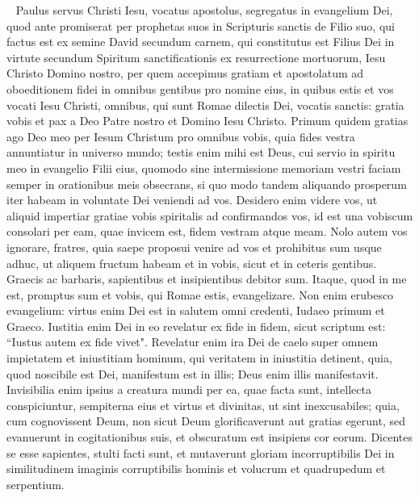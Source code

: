 
\begin{biblechapter}   
\verse Paulus servus Christi Iesu, vocatus apostolus, segregatus in evangelium Dei, 
\verse quod ante promiserat per prophetas suos in Scripturis sanctis 
\verse de Filio suo, qui factus est ex semine David secundum carnem, 
\verse qui constitutus est Filius Dei in virtute secundum Spiritum sanctificationis ex resurrectione mortuorum, Iesu Christo Domino nostro, 
\verse per quem accepimus gratiam et apostolatum ad oboeditionem fidei in omnibus gentibus pro nomine eius, 
\verse in quibus estis et vos vocati Iesu Christi,  
\verse omnibus, qui sunt Romae dilectis Dei, vocatis sanctis: gratia vobis et pax a Deo Patre nostro et Domino Iesu Christo. 
\verse Primum quidem gratias ago Deo meo per Iesum Christum pro omnibus vobis, quia fides vestra annuntiatur in universo mundo; 
\verse testis enim mihi est Deus, cui servio in spiritu meo in evangelio Filii eius, quomodo sine intermissione memoriam vestri faciam 
\verse semper in orationibus meis obsecrans, si quo modo tandem aliquando prosperum iter habeam in voluntate Dei veniendi ad vos. 
\verse Desidero enim videre vos, ut aliquid impertiar gratiae vobis spiritalis ad confirmandos vos, 
\verse id est una vobiscum consolari per eam, quae invicem est, fidem vestram atque meam. 
\verse Nolo autem vos ignorare, fratres, quia saepe proposui venire ad vos et prohibitus sum usque adhuc, ut aliquem fructum habeam et in vobis, sicut et in ceteris gentibus. 
\verse Graecis ac barbaris, sapientibus et insipientibus debitor sum. 
\verse Itaque, quod in me est, promptus sum et vobis, qui Romae estis, evangelizare. 
\verse Non enim erubesco evangelium: virtus enim Dei est in salutem omni credenti, Iudaeo primum et Graeco. 
\verse Iustitia enim Dei in eo revelatur ex fide in fidem, sicut scriptum est: “Iustus autem ex fide vivet". 
\verse Revelatur enim ira Dei de caelo super omnem impietatem et iniustitiam hominum, qui veritatem in iniustitia detinent, 
\verse quia, quod noscibile est Dei, manifestum est in illis; Deus enim illis manifestavit. 
\verse Invisibilia enim ipsius a creatura mundi per ea, quae facta sunt, intellecta conspiciuntur, sempiterna eius et virtus et divinitas, ut sint inexcusabiles; 
\verse quia, cum cognovissent Deum, non sicut Deum glorificaverunt aut gratias egerunt, sed evanuerunt in cogitationibus suis, et obscuratum est insipiens cor eorum. 
\verse Dicentes se esse sapientes, stulti facti sunt, 
\verse et mutaverunt gloriam incorruptibilis Dei in similitudinem imaginis corruptibilis hominis et volucrum et quadrupedum et serpentium. 

\end{biblechapter}
